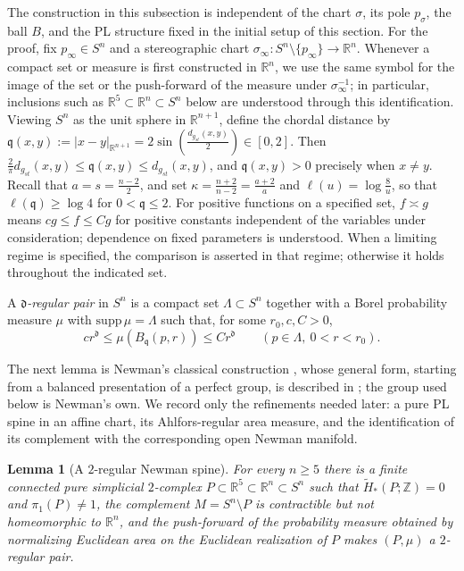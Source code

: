 \documentclass[12pt,oneside,a4paper]{article}
\theoremstyle{mytheorem}
\newtheorem{lemma}[definition]{Lemma}
\theoremstyle{remark}
\theoremstyle{definition}
\begin{document}
The construction in this subsection is independent of the chart
$\sigma$, its pole $p_\sigma$, the ball $B$, and the PL structure fixed
in the initial setup of this section.  For the proof, fix
$p_\infty\in S^n$ and a stereographic chart
$\sigma_\infty:S^n\setminus\{p_\infty\}\to\mathbb R^n$.  Whenever a compact
set or measure is first constructed in $\mathbb R^n$, we use the same
symbol for the image of the set or the push-forward of the measure under
$\sigma_\infty^{-1}$; in particular,
inclusions such as $\mathbb R^5\subset\mathbb R^n\subset S^n$ below
are understood through this identification.  Viewing $S^n$ as the unit
sphere in $\mathbb R^{n+1}$, define the chordal distance by
$\mathfrak q(x,y):=|x-y|_{\mathbb R^{n+1}}
=2\sin\!\left(\frac{d_{g_{st}}(x,y)}{2}\right)\in[0,2].$
Then $\frac{2}{\pi}d_{g_{st}}(x,y)\leq \mathfrak q(x,y)\leq d_{g_{st}}(x,y)$,
and $\mathfrak q(x,y)>0$ precisely when $x\neq y$.
Recall that $a=s=\frac{n-2}{2}$, and set
$\kappa=\frac{n+2}{n-2}=\frac{a+2}{a}$ and
$\ell(u)=\log\frac{8}{u}$,
so that $\ell(\mathfrak q)\geq\log4$ for $0<\mathfrak q\leq2$.  For positive functions on a
specified set, $f\asymp g$ means $cg\leq f\leq Cg$ for positive
constants independent of the variables under consideration; dependence
on fixed parameters is understood.  When a limiting regime is specified,
the comparison is asserted in that regime; otherwise it holds throughout
the indicated set.

A \emph{$\mathfrak d$-regular pair} in $S^n$ is a compact set
$\Lambda\subset S^n$ together with a Borel probability measure $\mu$
with $\mathrm{supp}\,\mu=\Lambda$ such that, for some $r_0,c,C>0$,
\begin{equation}\label{eq:regular}
 cr^{\mathfrak d}\le\mu(B_{\mathfrak q}(p,r))\le Cr^{\mathfrak d}
 \qquad(p\in\Lambda,\ 0<r<r_0).
\end{equation}



The next lemma is Newman's classical construction \cite{zbMATH03054974},
whose general form, starting from a balanced presentation of a perfect
group, is described in \cite[Example~3.2.2]{zbMATH07206284}; the group
used below is Newman's own.  We record only the refinements needed
later: a pure PL spine in an affine chart, its Ahlfors-regular area
measure, and the identification of its complement with the
corresponding open Newman manifold.

\begin{lemma}[A $2$-regular Newman spine]\label{lem:topological}
For every $n\geq 5$ there is a finite connected pure simplicial $2$-complex
$P\subset\mathbb R^5\subset\mathbb R^n\subset S^n$ such that
\(\widetilde H_*(P;\mathbb Z)=0\)
and \(\pi_1(P)\ne1\),
the complement $M=S^n\setminus P$ is contractible but not homeomorphic
to $\mathbb R^n$, and the push-forward of the probability measure
obtained by normalizing Euclidean area on the Euclidean realization of
$P$ makes $(P,\mu)$ a $2$-regular pair.
\end{lemma}
\end{document}
